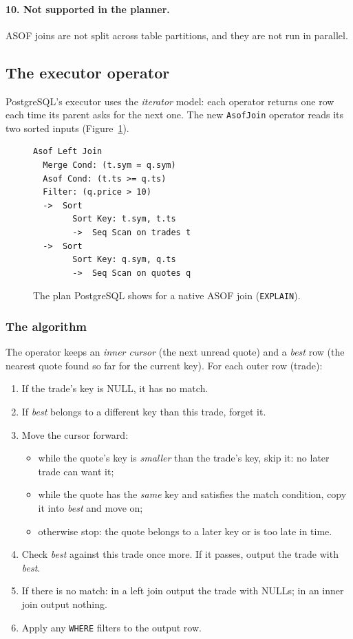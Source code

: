 \documentclass[11pt,a4paper]{article}
\newcommand{\code}[1]{\texttt{#1}}
\begin{document}
\paragraph{10. Not supported in the planner.}
ASOF joins are not split across table partitions, and they are not run in parallel.

\subsection{The executor operator}
\label{sec:executor}

PostgreSQL's executor uses the \emph{iterator} model: each operator returns one row each
time its parent asks for the next one. The new \code{AsofJoin} operator reads its two
sorted inputs (Figure~\ref{fig:plan}).

\begin{figure}[h]
\centering
\begin{lstlisting}[style=plain]
Asof Left Join
  Merge Cond: (t.sym = q.sym)
  Asof Cond: (t.ts >= q.ts)
  Filter: (q.price > 10)
  ->  Sort
        Sort Key: t.sym, t.ts
        ->  Seq Scan on trades t
  ->  Sort
        Sort Key: q.sym, q.ts
        ->  Seq Scan on quotes q
\end{lstlisting}
\caption{The plan PostgreSQL shows for a native ASOF join (\code{EXPLAIN}).}
\label{fig:plan}
\end{figure}

\subsubsection{The algorithm}

The operator keeps an \emph{inner cursor} (the next unread quote) and a \emph{best} row
(the nearest quote found so far for the current key). For each outer row (trade):

\begin{enumerate}
  \item If the trade's key is NULL, it has no match.
  \item If \emph{best} belongs to a different key than this trade, forget it.
  \item Move the cursor forward:
    \begin{itemize}
      \item while the quote's key is \emph{smaller} than the trade's key, skip it: no
            later trade can want it;
      \item while the quote has the \emph{same} key and satisfies the match condition,
            copy it into \emph{best} and move on;
      \item otherwise stop: the quote belongs to a later key or is too late in time.
    \end{itemize}
  \item Check \emph{best} against this trade once more. If it passes, output the trade
        with \emph{best}.
  \item If there is no match: in a left join output the trade with NULLs; in an inner
        join output nothing.
  \item Apply any \code{WHERE} filters to the output row.
\end{enumerate}
\end{document}
